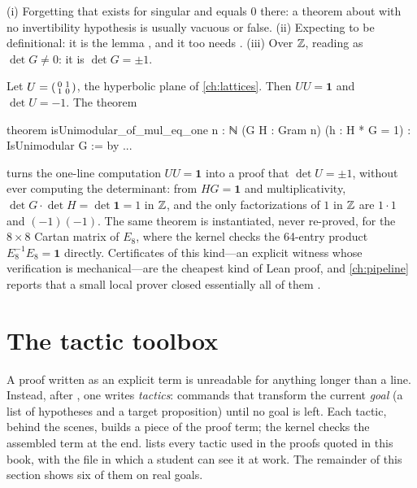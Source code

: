 \begin{pitfallbox}
(i) Forgetting that  exists for singular  and equals $0$ there: a theorem
about  with no invertibility hypothesis is usually vacuous or false.
(ii) Expecting  to be definitional: it is the lemma
, and it too needs .
(iii) Over $\mathbb{Z}$, reading  as $\det G\neq0$: it is $\det G=\pm1$.
\end{pitfallbox}

\begin{example}\label{ex:leanprimer:certificate}
Let $U=\begin{psmallmatrix}0&1\\1&0\end{psmallmatrix}$, the hyperbolic plane of
\cref{ch:lattices}. Then $UU=\mathbf 1$ and $\det U=-1$. The theorem
\begin{leancode}
theorem isUnimodular_of_mul_eq_one {n : ℕ} (G H : Gram n) (h : H * G = 1) :
    IsUnimodular G := by ...
\end{leancode}
turns the one-line computation $UU=\mathbf 1$ into a proof that $\det U=\pm1$, without
ever computing the determinant: from $HG=\mathbf 1$ and multiplicativity,
$\det G\cdot\det H=\det\mathbf 1=1$ in $\mathbb{Z}$, and the only factorizations of $1$ in $\mathbb{Z}$
are $1\cdot1$ and $(-1)(-1)$. The same theorem is instantiated, never re-proved, for the
$8\times8$ Cartan matrix of $E_8$, where the kernel checks the 64-entry product
$E_8^{-1}E_8=\mathbf 1$ directly. Certificates of this kind---an explicit witness whose
verification is mechanical---are the cheapest kind of Lean proof, and \cref{ch:pipeline}
reports that a small local prover closed essentially all of them
.
\end{example}

\section{The tactic toolbox}\label{sec:leanprimer:tactics}

A proof written as an explicit term is unreadable for anything longer than a line. Instead,
after , one writes \emph{tactics}: commands that transform the
current \emph{goal} (a list of hypotheses and a target proposition) until no goal is left.
Each tactic, behind the scenes, builds a piece of the proof term; the kernel checks the
assembled term at the end.  lists every tactic used in the
proofs quoted in this book, with the file in which a student can see it at work. The
remainder of this section shows six of them on real goals.

